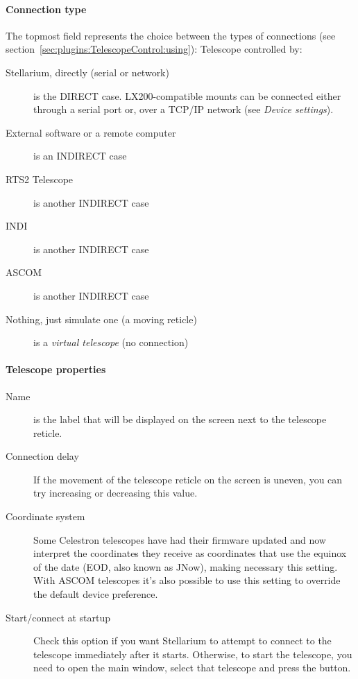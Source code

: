 \paragraph{Connection type}
The topmost field represents the choice between the types of connections (see section~\ref{sec:plugins:TelescopeControl:using}):
Telescope controlled by:
\begin{description}
\item[Stellarium, directly (serial or network)] is the DIRECT case.
  LX200-compatible mounts can be connected either through a serial port or,
   over a TCP/IP network (see \emph{Device settings}).
\item[External software or a remote computer] is an INDIRECT case
\item[RTS2 Telescope] is another INDIRECT case
\item[INDI] is another INDIRECT case
\item[ASCOM] is another INDIRECT case
\item[Nothing, just simulate one (a moving reticle)] is a \emph{virtual telescope} (no connection)
\end{description}

\paragraph{Telescope properties}
\label{sec:plugins:TelescopeProperties}

\begin{description}
\item[Name] is the label that will be displayed on the screen next to
  the telescope reticle.
\item[Connection delay] If the movement of the telescope reticle on
  the screen is uneven, you can try increasing or decreasing this
  value.
\item[Coordinate system] Some Celestron telescopes have had their
  firmware updated and now interpret the coordinates they receive as
  coordinates that use the equinox of the date (EOD, also known as
  JNow), making necessary this setting. With ASCOM telescopes it's also
  possible to use this setting to override the default device preference. 
\item[Start/connect at startup] Check this option if you want
  Stellarium to attempt to connect to the telescope immediately after
  it starts. Otherwise, to start the telescope, you need to open the
  main window, select that telescope and press the 
  button.
\end{description}

